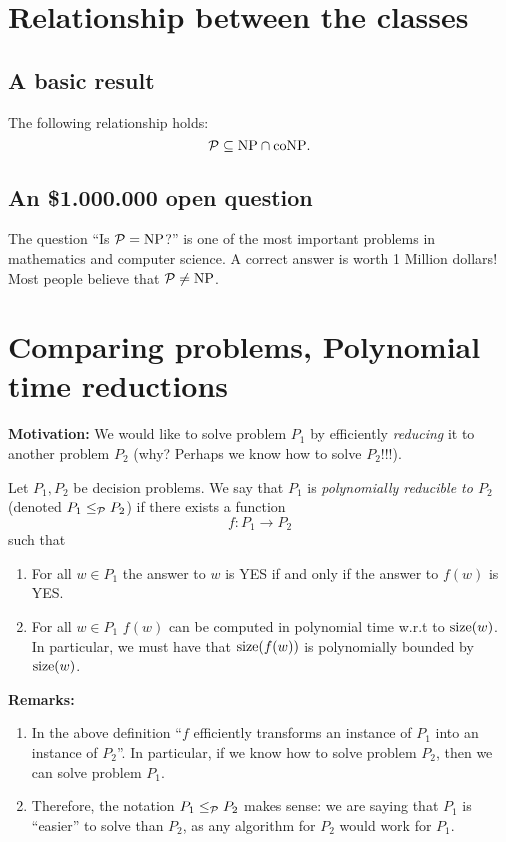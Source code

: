 \documentclass[../open-optimization/open-optimization.tex]{subfiles}
\begin{document}
\section{Relationship between the classes}
\subsection{A basic result}
 
\begin{theorem} The following relationship holds:
{\huge $${\mathcal{P}}\subseteq \text{NP}\cap\text{coNP}.$$}
\end{theorem}

\subsection{An \$1.000.000 open question}
 The question ``Is ${\mathcal{P}}=\text{NP}$?'' is one of the most important problems in mathematics and computer science. A correct answer is worth 1 Million dollars! Most people believe that ${\mathcal{P}}\neq \text{NP}$.

 \section{Comparing problems, Polynomial time reductions}

{\bf Motivation:} We would like to solve problem $P_1$ by efficiently {\em reducing} it to another problem $P_2$ (why? Perhaps we know how to solve $P_2$!!!).

	\begin{definition} 
Let $P_1,P_2$ be decision problems. We say that $P_1$ is {\em polynomially reducible to $P_2$} (denoted $P_1\leq_{{\mathcal{P}}}P_2$) if there exists a function
$$f:P_1\rightarrow P_2$$
such that 
\begin{enumerate}
	\item For all $w\in P_1$ the answer to $w$ is YES if and only if the answer to $f(w)$ is YES.
	\item For all $w\in P_1$ $f(w)$ can be computed in polynomial time w.r.t to $\textup{size}(w)$. In particular, we must have that $\textup{size}(f(w))$ is polynomially bounded by $\textup{size}(w)$.
\end{enumerate}
\end{definition}

{\bf Remarks:} \begin{enumerate}
	\item In the above definition ``$f$ efficiently transforms an instance of $P_1$ into an instance of $P_2$''. In particular, if we know how to solve problem $P_2$, then we can solve problem $P_1$.
	\item Therefore, the notation $P_1\leq_{{\mathcal{P}}}P_2$ makes sense: we are saying that $P_1$ is ``easier'' to solve than $P_2$, as any algorithm for $P_2$ would work for $P_1$. 
\end{enumerate} 
\end{document}
